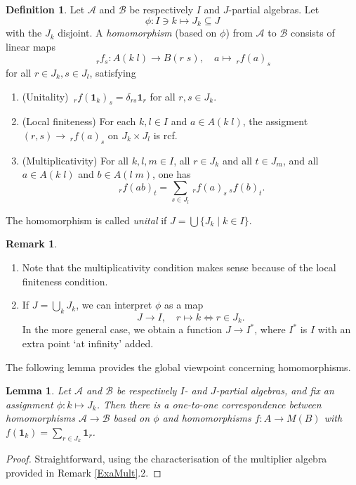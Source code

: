 \documentclass[10pt]{article}
\newcommand{\GrDA}[3]{{}_{\;#2}#1_{#3}} %
\newcommand{\Unit}{\mathbf{1}}
\newtheorem{Lem}[Theorem]{Lemma}
\theoremstyle{definition}
\newtheorem{Def}[Theorem]{Definition}
\newtheorem{Rem}[Theorem]{Remark}
\numberwithin{equation}{section}
\begin{document}
\begin{Def}\label{DefMor} Let $\mathscr{A}$ and $\mathscr{B}$ be respectively $I$ and $J$-partial algebras. Let \[\phi: I \ni k \mapsto J_k \subseteq J\] with the $J_k$ disjoint. A \emph{homomorphism} (based on $\phi$) from $\mathscr{A}$ to $\mathscr{B}$ consists of linear maps \[\GrDA{f}{r}{s}: A(k\;l)\rightarrow B(r\;s),\quad a\mapsto \GrDA{f(a)}{r}{s}\] for all $r\in J_k, s\in J_l$, satisfying 
\begin{enumerate}[label = (\arabic*)]
\item (Unitality) $\GrDA{f(\Unit_{k})}{r}{s} = \delta_{rs}\Unit_r$ for all $r,s\in J_k$.
\item (Local finiteness) For each $k,l\in I$ and $a\in A(k\;l)$, the assigment $(r,s)\rightarrow \GrDA{f(a)}{r}{s}$ on $J_k\times J_l$ is rcf. 
\item (Multiplicativity) For all $k,l,m\in I$, all $r\in J_k$ and all $t\in J_m$, and all $a\in A(k\;l)$ and $b\in A(l\;m)$, one has \[\GrDA{f(ab)}{r}{t} = \sum_{s\in J_l} \GrDA{f(a)}{r}{s}\GrDA{f(b)}{s}{t}.\]
\end{enumerate} 
The homomorphism is called \emph{unital} if $J=\bigcup \{J_k\mid k\in I\}$. %
\end{Def}
\begin{Rem}
\begin{enumerate}
\item
Note that the multiplicativity condition makes sense because of the local finiteness condition.
\item
If $J = \bigcup_{k} J_k$, we can interpret $\phi$ as a map \[J\rightarrow I,\quad r\mapsto k \iff r\in J_k.\] In the more general case, we obtain a function $J\rightarrow I^*$, where $I^*$ is $I$ with an extra point `at infinity' added.
\end{enumerate}
\end{Rem}

The following lemma provides the global viewpoint concerning homomorphisms. 

\begin{Lem}\label{LemPAMor} Let $\mathscr{A}$ and $\mathscr{B}$ be respectively $I$- and $J$-partial algebras, and fix an assignment $\phi: k\mapsto J_k$. Then there is a one-to-one correspondence between homomorphisms $\mathscr{A}\rightarrow \mathscr{B}$ based on $\phi$ and homomorphisms $f:A\rightarrow M(B)$ with $f(\Unit_k) = \sum_{r\in J_k} \Unit_r$. 
\end{Lem} 
\begin{proof}
Straightforward, using the characterisation of the multiplier algebra provided in Remark \ref{ExaMult}.2.
\end{proof}
\end{document}
